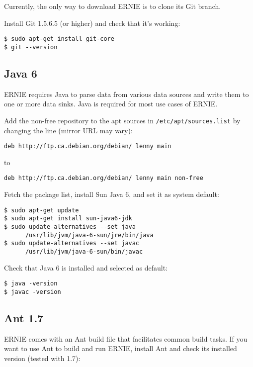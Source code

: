 \documentclass{article}
\begin{document}
Currently, the only way to download ERNIE is to clone its Git branch.

Install Git 1.5.6.5 (or higher) and check that it's working:

\begin{verbatim}
$ sudo apt-get install git-core
$ git --version
\end{verbatim}

\subsection{Java 6}

ERNIE requires Java to parse data from various data sources and write them
to one or more data sinks. Java is required for most use cases of ERNIE.

Add the non-free repository to the apt sources in
\verb+/etc/apt/sources.list+ by changing the line (mirror URL may vary):

\begin{verbatim}
deb http://ftp.ca.debian.org/debian/ lenny main
\end{verbatim}

to

\begin{verbatim}
deb http://ftp.ca.debian.org/debian/ lenny main non-free
\end{verbatim}

Fetch the package list, install Sun Java 6, and set it as system default:

\begin{verbatim}
$ sudo apt-get update
$ sudo apt-get install sun-java6-jdk
$ sudo update-alternatives --set java
      /usr/lib/jvm/java-6-sun/jre/bin/java
$ sudo update-alternatives --set javac
      /usr/lib/jvm/java-6-sun/bin/javac
\end{verbatim}

Check that Java 6 is installed and selected as default:

\begin{verbatim}
$ java -version
$ javac -version
\end{verbatim}

\subsection{Ant 1.7}

ERNIE comes with an Ant build file that facilitates common build tasks.
If you want to use Ant to build and run ERNIE, install Ant and check its
installed version (tested with 1.7):
\end{document}
